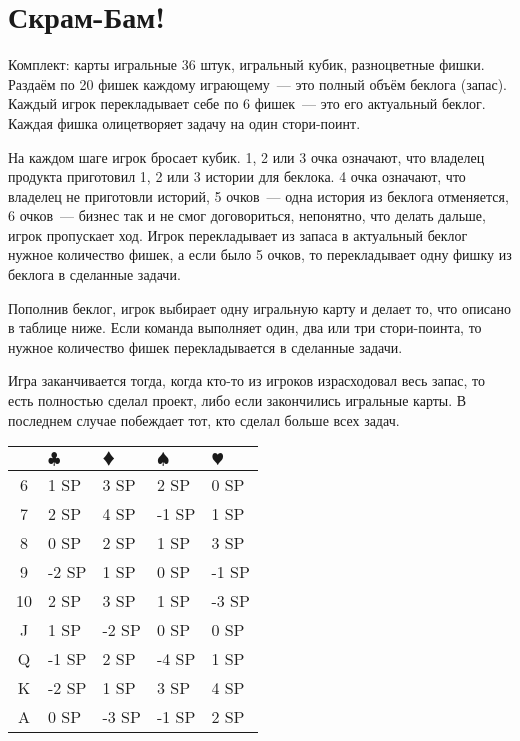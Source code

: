 \documentclass{article}
\begin{document}
\section*{Скрам-Бам!}

\justifying

Комплект: карты игральные 36 штук, игральный кубик, разноцветные фишки.
Раздаём по 20 фишек каждому играющему~--- это полный объём беклога (запас).
Каждый игрок перекладывает себе по 6 фишек~--- это его актуальный беклог.
Каждая фишка олицетворяет задачу на один стори-поинт.

На каждом шаге игрок бросает кубик. 1, 2 или 3 очка означают, что владелец продукта приготовил 1, 2 или 3 истории для беклока. 4 очка означают, что владелец не приготовли историй, 5 очков~--- одна история из беклога отменяется, 6 очков~--- бизнес так и не смог договориться, непонятно, что делать дальше, игрок пропускает ход. Игрок перекладывает из запаса в актуальный беклог нужное количество фишек, а если было 5 очков, то перекладывает одну фишку из беклога в сделанные задачи.

Пополнив беклог, игрок выбирает одну игральную карту и делает то, что описано в таблице ниже. Если команда выполняет один, два или три стори-поинта, то нужное количество фишек перекладывается в сделанные задачи.

Игра заканчивается тогда, когда кто-то из игроков израсходовал весь запас, то есть полностью сделал проект, либо если закончились игральные карты. В последнем случае побеждает тот, кто сделал больше всех задач.

\begin{center}
\begin{tabular}{ | c | m{2.8cm} | m{2.8cm} | m{2.8cm} | m{2.8cm} | }
\hline
 & {\huge $\clubsuit$} & {\huge\color{red} $\vardiamondsuit$} & {\huge $\spadesuit$} & {\huge\color{red} $\varheartsuit$} \\
\hline
 6 & 1 SP & 3 SP & 2 SP & 0 SP \\
\hline
 7 & 2 SP & 4 SP & -1 SP & 1 SP \\
\hline
 8 & 0 SP & 2 SP & 1 SP & 3 SP \\
\hline
 9 & -2 SP & 1 SP & 0 SP & -1 SP \\
\hline
10 & 2 SP & 3 SP & 1 SP & -3 SP \\
\hline
 J & 1 SP & -2 SP & 0 SP & 0 SP \\
\hline
 Q & -1 SP & 2 SP & -4 SP & 1 SP \\
\hline
 K & -2 SP & 1 SP & 3 SP & 4 SP \\
\hline
 A & 0 SP & -3 SP & -1 SP & 2 SP \\
 \hline
\end{tabular}
\end{center}
\end{document}
